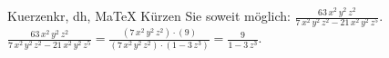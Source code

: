 \begin{MAufgabe}{Kuerzen}{kr, dh, MaTeX}
K\"urzen Sie soweit m\"oglich: $\frac{63\, x^2\, y^2\, z^2}{7\, x^2\, y^2\, z^2 - 21\, x^2\, y^2\, z^5}$.\\ 
\ifLsg\MLoesung
\quad $\frac{63\, x^2\, y^2\, z^2}{7\, x^2\, y^2\, z^2 - 21\, x^2\, y^2\, z^5}=\frac{(7\, x^2\, y^2\, z^2)\cdot(9)}{(7\, x^2\, y^2\, z^2)\cdot(1 - 3\, z^3)}=\frac{9}{1 - 3\, z^3}$.\else\relax\fi
 \end{MAufgabe}